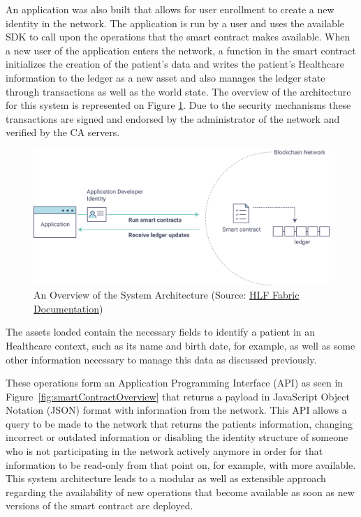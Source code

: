 An application was also built that allows for user enrollment to create a new
identity in the network. The application is run by a user and uses the
available SDK to call upon the operations that the smart contract makes
available. When a new user of the application enters the network, a function in
the smart contract initializes the creation of the patient's data and writes
the patient's Healthcare information to the ledger as a new asset and also
manages the ledger state through transactions as well as the world state.  The
overview of the architecture for this system is represented on Figure
\ref{fig:appOverview}. Due to the security mechanisms these transactions are
signed and endorsed by the administrator of the network and verified by the CA
servers.

\begin{figure}[ht] \centering
  \includegraphics[width=1\linewidth]{imgs/hyperledgerAppOverview.png}
  \caption{\label{fig:appOverview}An Overview of the System Architecture
  (Source:
  \href{http://hyperledger-fabric.readthedocs.io/en/latest/write_first_app.html}{HLF
  Fabric Documentation})} 
\end{figure}

The assets loaded contain the necessary fields to identify a patient in an
Healthcare context, such as its name and birth date, for example, as well as
some other information necessary to manage this data as discussed previously.

These operations form an Application Programming Interface (API) as seen in
Figure~\ref{fig:smartContractOverview} that returns a payload in JavaScript
Object Notation (JSON) format with information from the network. This API
allows a query to be made to the network that returns the patients information,
changing incorrect or outdated information or disabling the identity structure
of someone who is not participating in the network actively anymore in order
for that information to be read-only from that point on, for example, with more
available. This system architecture leads to a modular as well as extensible
approach regarding the availability of new operations that become available as
soon as new versions of the smart contract are deployed.  

